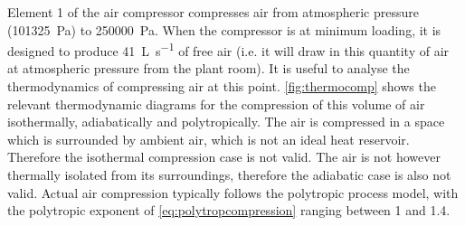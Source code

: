 Element 1 of the air compressor compresses air from atmospheric pressure (\SI{101325}{\pascal}) to \SI{250000}{\pascal}. When the compressor is at minimum loading, it is designed to produce \SI{41}{\liter \per \second} of free air (i.e. it will draw in this quantity of air at atmospheric pressure from the plant room). It is useful to analyse the thermodynamics of compressing air at this point. \autoref{fig:thermocomp} shows the relevant thermodynamic diagrams for the compression of this volume of air isothermally, adiabatically and polytropically. The air is compressed in a space which is surrounded by ambient air, which is not an ideal heat reservoir. Therefore the isothermal compression case is not valid. The air is not however thermally isolated from its surroundings, therefore the adiabatic case is also not valid. Actual air compression typically follows the polytropic process model, with the polytropic exponent of \autoref{eq:polytropcompression} ranging between 1 and 1.4.

